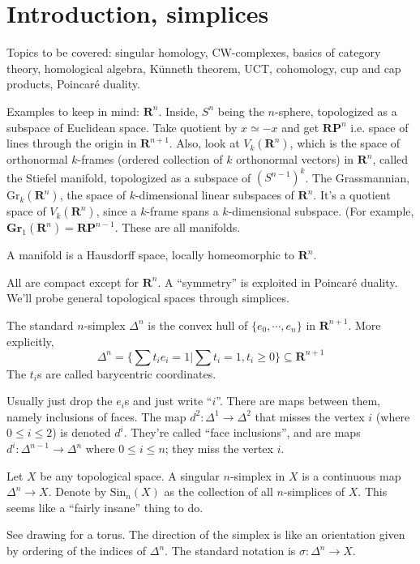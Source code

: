 \section{Introduction, simplices}
Topics to be covered: singular homology, CW-complexes, basics of category theory, homological algebra, K\"{u}nneth theorem, UCT, cohomology, cup and cap products, Poincar\'{e} duality.

Examples to keep in mind: $\mathbf{R}^n$. Inside, $S^n$ being the $n$-sphere, topologized as a subspace of Euclidean space. Take quotient by $x\simeq -x$ and get $\mathbf{RP}^n$ i.e. space of lines through the origin in $\mathbf{R}^{n+1}$. Also, look at $V_k(\mathbf{R}^n)$, which is the space of orthonormal $k$-frames (ordered collection of $k$ orthonormal vectors) in $\mathbf{R}^n$, called the Stiefel manifold, topologized as a subspace of $(S^{n-1})^k$. The Grassmannian, $\mathrm{Gr}_k(\mathbf{R}^n)$, the space of $k$-dimensional linear subspaces of $\mathbf{R}^n$. It's a quotient space of $V_k(\mathbf{R}^n)$, since a $k$-frame spans a $k$-dimensional subspace. (For example, $\mathbf{Gr}_1(\mathbf{R}^n) = \mathbf{RP}^{n-1}$. These are all manifolds.
\begin{definition}
A manifold is a Hausdorff space, locally homeomorphic to $\mathbf{R}^n$.
\end{definition}
All are compact except for $\mathbf{R}^n$. A ``symmetry'' is exploited in Poincar\'{e} duality. We'll probe general topological spaces through simplices.
\begin{definition}
The standard $n$-simplex $\Delta^n$ is the convex hull of $\{e_0,\cdots,e_n\}$ in $\mathbf{R}^{n+1}$. More explicitly,
$$\Delta^n = \{\sum t_i e_i = 1 | \sum t_i = 1, t_i\geq 0\}\subseteq\mathbf{R}^{n+1}$$
The $t_i$s are called barycentric coordinates.
\end{definition}
Usually just drop the $e_i$s and just write ``$i$''. There are maps between them, namely inclusions of faces. The map $d^2:\Delta^1\to\Delta^2$ that misses the vertex $i$ (where $0\leq i\leq 2$) is denoted $d^i$. They're called ``face inclusions'', and are maps $d^i:\Delta^{n-1}\to\Delta^n$ where $0\leq i\leq n$; they miss the vertex $i$.
\begin{definition}
Let $X$ be any topological space. A singular $n$-simplex in $X$ is a continuous map $\Delta^n\to X$. Denote by $\mathrm{Sin}_n(X)$ as the collection of all $n$-simplices of $X$. This seems like a ``fairly insane'' thing to do.
\end{definition}
See drawing for a torus. The direction of the simplex is like an orientation given by ordering of the indices of $\Delta^n$. The standard notation is $\sigma:\Delta^n\to X$.


